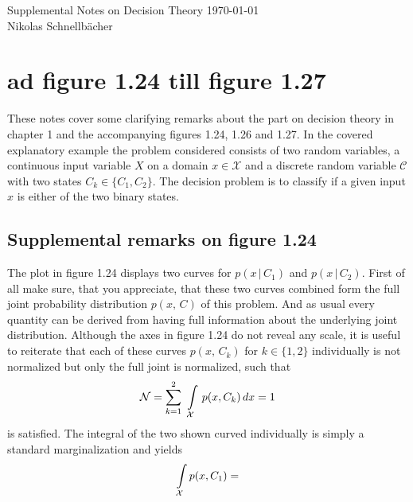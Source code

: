 \documentclass[11pt, DINA4, fleqn]{amsart}
\begin{document}
\pagestyle{fancy}

\begin{flushleft}
{\sc \Large Supplemental Notes on Decision Theory} \hfill \today \\
\medskip
Nikolas Schnellbächer \underline{\hspace{6.53in}} \\
\end{flushleft}

\section{ad figure 1.24 till figure 1.27}
These notes cover some clarifying remarks about the part on decision theory in chapter 1 and the accompanying figures 1.24, 1.26 and 1.27. In the covered explanatory example the problem considered consists of two random variables,
a continuous input variable $X$ on a domain $x\in\mathcal{X}$ and a discrete random variable $\mathcal{C}$ with two states $C_k\in \{C_1, C_2 \}$. The decision problem is to classify if a given input $x$ is either of the two binary states.

\subsection{Supplemental remarks on figure 1.24}
The plot in figure 1.24 displays two curves for $p(x \, | \, C_1)$ and $p(x \, | \, C_2)$. First of all make sure, that you appreciate, that these two curves combined
form the full joint probability distribution $p(x, \, C)$ of this problem. And as usual every quantity can be derived from having full information about the underlying joint distribution. Although the axes in figure 1.24 do not reveal any scale, it is useful to reiterate that each of these curves $p(x, \, C_k)$ for $k\in\{1, 2\}$ individually is not normalized but only the full joint is normalized, such that
\begin{align}
\mathcal{N} = \sum_{k=1}^{2} \, \, \int\displaylimits_{\mathcal{X}} \, p(x, C_k) \, dx = 1
\end{align}
is satisfied. The integral of the two shown curved individually is simply a standard marginalization and yields
\begin{align}
\int\displaylimits_{\mathcal{X}} p(x, C_1) = 
\end{align}

\newpage
\end{document}
